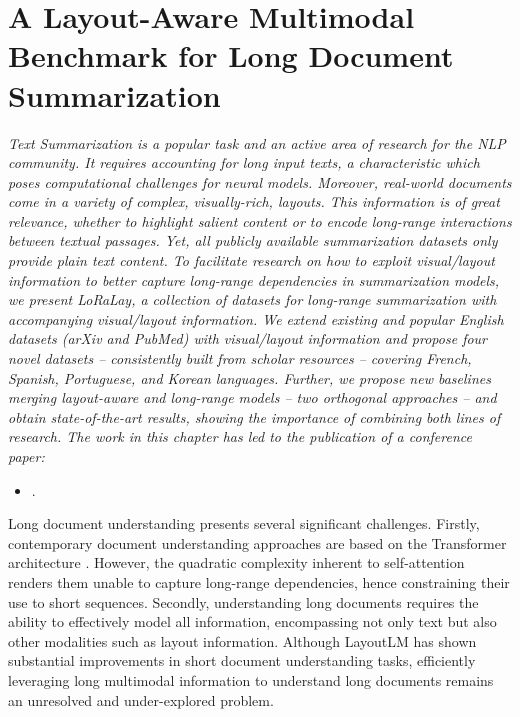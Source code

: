 
\chapter{A Layout-Aware Multimodal Benchmark for Long Document Summarization}
\label{chapter:loralay}

\renewcommand{\leftmark}{\spacedlowsmallcaps{A Long and Layout-Aware Multimodal Benchmark for Text Summarization}}

\begin{chapabstract}
    {\em
    Text Summarization is a popular task and an active area of research for the \ac{NLP} community. It requires accounting for long input texts, a characteristic which poses computational challenges for neural models. 
    Moreover, real-world documents come in a variety of complex, visually-rich, layouts. This information is of great relevance, whether to highlight salient content or to encode long-range interactions between textual passages. Yet, all publicly available summarization datasets only provide plain text content.
    To facilitate research on how to exploit visual/layout information to better capture long-range dependencies in summarization models, we present \textit{LoRaLay}, a collection of datasets for long-range summarization with accompanying visual/layout information. We extend existing and popular English datasets (arXiv and PubMed) with visual/layout information and propose four novel datasets -- consistently built from scholar resources -- covering French, Spanish, Portuguese, and Korean languages.
    Further, we propose new baselines merging layout-aware and long-range models -- two orthogonal approaches -- and obtain state-of-the-art results, showing the importance of combining both lines of research.
    \vspace*{5mm}
    The work in this chapter has led to the publication of a conference paper:}
    \begin{itemize}
        \item \small {}.
    \end{itemize}
\end{chapabstract}



\newpage

\minitoc
{}

Long document understanding presents several significant challenges. Firstly, contemporary document understanding approaches are based on the Transformer architecture \citep{vaswani2017attention}. However, the quadratic complexity inherent to self-attention renders them unable to capture long-range dependencies, hence constraining their use to short sequences. Secondly, understanding long documents requires the ability to effectively model all information, encompassing not only text but also other modalities such as layout information. Although LayoutLM \citep{xu2020layoutlm} has shown substantial improvements in short document understanding tasks, efficiently leveraging long multimodal information to understand long documents remains an unresolved and under-explored problem.

